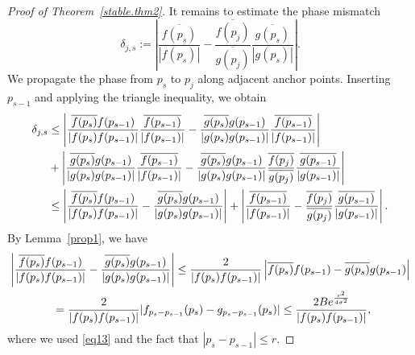 \documentclass[10pt,a4paper]{amsart}
\begin{document}
\begin{proof}[Proof of Theorem~\ref{stable.thm2}]
It remains to estimate the phase mismatch
$$\delta_{j,s} := \left| \frac{\overline{f(p_s)}}{|f(p_s)|} - \frac{\overline{f(p_j)}}{\overline{g(p_j)}} \frac{\overline{g(p_s)}}{|g(p_s)|} \right|.$$
We propagate the phase from $p_s$ to $p_j$ along adjacent anchor points. Inserting
$p_{s-1}$ and applying the triangle inequality, we obtain
\begin{align}\label{phase.pro.proof.eq1}
    \delta_{j,s} &\le
     \left|  \frac{\overline{f(p_s)} f(p_{s-1}) }{|f(p_s) f(p_{s-1})|} \frac{\overline{f(p_{s-1})}}{|f(p_{s-1})|} - \frac{\overline{g(p_s)} g(p_{s-1}) }{|g(p_s) g(p_{s-1})|}  \frac{\overline{f(p_{s-1})}}{|f(p_{s-1})|}  \right|  \notag \\
     &+   \left|  \frac{\overline{g(p_s)} g(p_{s-1}) }{|g(p_s) g(p_{s-1})|} \frac{\overline{f(p_{s-1})}}{|f(p_{s-1})|}   -   \frac{\overline{g(p_s)} g(p_{s-1}) }{|g(p_s) g(p_{s-1})|} \frac{\overline{f(p_j)}}{\overline{g(p_j)}} \frac{\overline{g(p_{s-1})}}{|g(p_{s-1})|} \right| \notag\\
     &\le \left| \frac{\overline{f(p_s)}f(p_{s-1})}{|f(p_s)f(p_{s-1})|}
- \frac{\overline{g(p_s)}g(p_{s-1})}{|g(p_s)g(p_{s-1})|} \right|
+ \left| \frac{\overline{f(p_{s-1})}}{|f(p_{s-1})|}
- \frac{\overline{f(p_j)}}{\overline{g(p_j)}}\frac{\overline{g(p_{s-1})}}{|g(p_{s-1})|}\right|.
\end{align}
By Lemma~\ref{prop1}, we have 
\begin{align}\label{phase.pro.proof.eq2}
\left| \frac{\overline{f(p_s)}f(p_{s-1})}{|f(p_s)f(p_{s-1})|} - \frac{\overline{g(p_s)}g(p_{s-1})}{|g(p_s)g(p_{s-1})|}\right|
&\le\frac{2}{|f(p_s)f(p_{s-1})|}\left|\overline{f(p_s)}f(p_{s-1}) - \overline{g(p_s)}g(p_{s-1}) \right| \notag \\
\hskip-1.5in&\hskip-1.5in= \frac{2}{|f(p_s)f(p_{s-1})|} |f_{p_s-p_{s-1}}(p_s)-g_{p_s-p_{s-1}}(p_s)| \le \frac{2Be^{\frac{r^2}{4\sigma^2}}}{|f(p_s)f(p_{s-1})|},
\end{align}
where we used \eqref{eq13} and the fact that $|p_s-p_{s-1}|\le r$. 


\end{proof}
\end{document}
